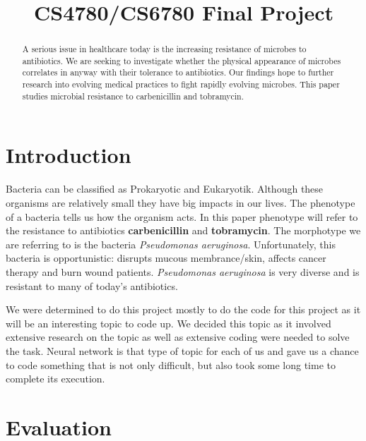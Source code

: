 \documentclass[conference]{IEEEtran}
\begin{document}
\title{CS4780/CS6780 Final Project}
\author{
}
\maketitle

\begin{abstract}
A serious issue in healthcare today is the increasing resistance of microbes to antibiotics. We are seeking to investigate whether the physical appearance of microbes correlates in anyway with their tolerance to antibiotics. Our findings hope to further research into evolving medical practices to fight rapidly evolving microbes. This paper studies microbial resistance to carbenicillin and tobramycin.


\end{abstract}



\section{Introduction}
Bacteria can be classified as Prokaryotic and Eukaryotik. Although these organisms are relatively small they have big impacts in our lives. The phenotype of a bacteria tells us how the organism acts. In this paper phenotype will refer to the resistance to antibiotics \textbf{carbenicillin} and \textbf{tobramycin}. The morphotype we are referring to is the bacteria \textit{Pseudomonas aeruginosa}. Unfortunately, this bacteria is opportunistic: disrupts mucous membrance/skin, affects cancer therapy and burn wound patients.
\textit{Pseudomonas aeruginosa} is very diverse and is resistant to many of today's antibiotics.

We were determined to do this project mostly to do the code for this project as it will be an interesting topic to code up. We decided this topic as it involved extensive research on the topic as well as extensive coding were needed to solve the task. Neural network is that type of topic for each of us and gave us a chance to code something that is not only difficult, but also took some long time to complete its execution. 


\section{Evaluation}
\end{document}
